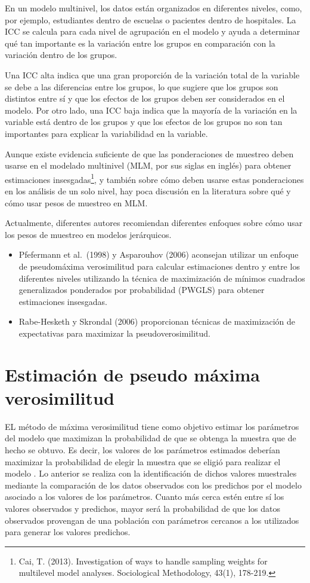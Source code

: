 \documentclass[
  12pt,
]{book}
\begin{document}
En un modelo multinivel, los datos están organizados en diferentes niveles, como, por ejemplo, estudiantes dentro de escuelas o pacientes dentro de hospitales. La ICC se calcula para cada nivel de agrupación en el modelo y ayuda a determinar qué tan importante es la variación entre los grupos en comparación con la variación dentro de los grupos.

Una ICC alta indica que una gran proporción de la variación total de la variable se debe a las diferencias entre los grupos, lo que sugiere que los grupos son distintos entre sí y que los efectos de los grupos deben ser considerados en el modelo. Por otro lado, una ICC baja indica que la mayoría de la variación en la variable está dentro de los grupos y que los efectos de los grupos no son tan importantes para explicar la variabilidad en la variable.

Aunque existe evidencia suficiente de que las ponderaciones de muestreo deben usarse en el modelado multinivel (MLM, por sus siglas en inglés) para obtener estimaciones insesgadas\footnote{Cai, T. (2013). Investigation of ways to handle sampling weights for multilevel model analyses. Sociological Methodology, 43(1), 178-219.}, y también sobre cómo deben usarse estas ponderaciones en los análisis de un solo nivel, hay poca discusión en la literatura sobre qué y cómo usar pesos de muestreo en MLM.

Actualmente, diferentes autores recomiendan diferentes enfoques sobre cómo usar los pesos de muestreo en modelos jerárquicos.

\begin{itemize}
\item
  Pfefermann et al.~(1998) y Asparouhov (2006) aconsejan utilizar un enfoque de pseudomáxima verosimilitud para calcular estimaciones dentro y entre los diferentes niveles utilizando la técnica de maximización de mínimos cuadrados generalizados ponderados por probabilidad (PWGLS) para obtener estimaciones insesgadas.
\item
  Rabe-Hesketh y Skrondal (2006) proporcionan técnicas de maximización de expectativas para maximizar la pseudoverosimilitud.
\end{itemize}

\section{Estimación de pseudo máxima verosimilitud}\label{estimaciuxf3n-de-pseudo-muxe1xima-verosimilitud}

EL método de máxima verosimilitud tiene como objetivo estimar los parámetros del modelo que maximizan la probabilidad de que se obtenga la muestra que de hecho se obtuvo. Es decir, los valores de los parámetros estimados deberían maximizar la probabilidad de elegir la muestra que se eligió para realizar el modelo . Lo anterior se realiza con la identificación de dichos valores muestrales mediante la comparación de los datos observados con los predichos por el modelo asociado a los valores de los parámetros. Cuanto más cerca estén entre sí los valores observados y predichos, mayor será la probabilidad de que los datos observados provengan de una población con parámetros cercanos a los utilizados para generar los valores predichos.
\end{document}
